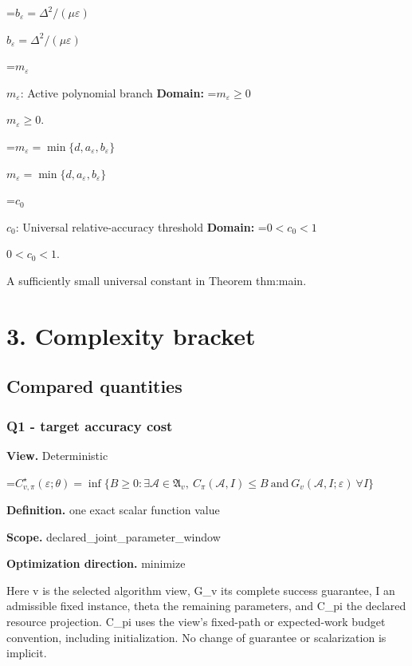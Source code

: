 \documentclass[10pt,a4paper]{article}
\newcommand{\AtlasMath}[1]{\par\begingroup\centering\setbox0=\hbox{$\displaystyle #1$}\ifdim\wd0>1.4\linewidth\typeout{ATLAS WIDE FORMULA: \the\wd0}\fi\ifdim\wd0>\linewidth\resizebox{\linewidth}{!}{\box0}\else\box0\fi\par\endgroup}
\newcommand{\AtlasInlineMath}[1]{\begingroup\setbox0=\hbox{$#1$}\ifdim\wd0>.4\linewidth\endgroup\AtlasMath{#1}\else\endgroup$#1$\fi}
\begin{document}
\AtlasInlineMath{b_\varepsilon=\Delta^2/(\mu\varepsilon)}



\AtlasInlineMath{m_\varepsilon}: Active polynomial branch \textbf{Domain:} \AtlasInlineMath{m_\varepsilon\ge0}.



\AtlasInlineMath{m_\varepsilon=\min\{d,a_\varepsilon,b_\varepsilon\}}



\AtlasInlineMath{c_0}: Universal relative-accuracy threshold \textbf{Domain:} \AtlasInlineMath{0<c_0<1}.



A sufficiently small universal constant in Theorem thm:main.



\section{3. Complexity bracket}


\subsection{Compared quantities}


\subsubsection{Q1 - target accuracy cost}


\textbf{View.} Deterministic



\AtlasMath{C^\star_{v,\pi}(\varepsilon;\theta)=\inf\{B\ge0:\exists\mathcal A\in\mathfrak A_v,\ C_\pi(\mathcal A,I)\le B\ \text{and}\ G_v(\mathcal A,I;\varepsilon)\ \forall I\}}


\textbf{Definition.} one exact scalar function value



\textbf{Scope.} declared\_joint\_parameter\_window



\textbf{Optimization direction.} minimize



Here v is the selected algorithm view, G\_v its complete success guarantee, I an admissible fixed instance, theta the remaining parameters, and C\_pi the declared resource projection. C\_pi uses the view's fixed-path or expected-work budget convention, including initialization. No change of guarantee or scalarization is implicit.
\end{document}
